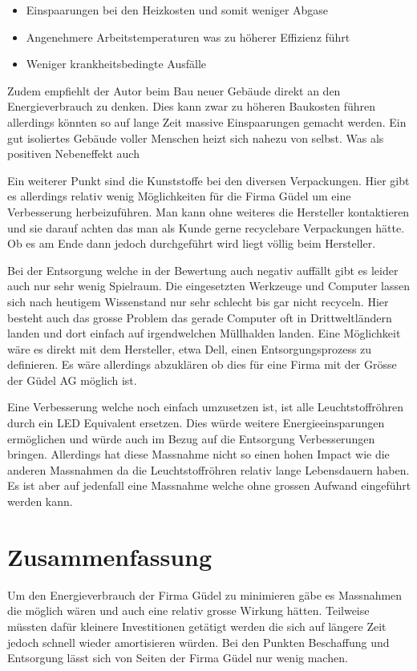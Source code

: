 \begin{itemize}
\item Einspaarungen bei den Heizkosten und somit weniger Abgase
\item Angenehmere Arbeitstemperaturen was zu höherer Effizienz führt
\item Weniger krankheitsbedingte Ausfälle
\end{itemize}

Zudem empfiehlt der Autor beim Bau neuer Gebäude direkt an den Energieverbrauch
zu denken. Dies kann zwar zu höheren Baukosten führen allerdings könnten so auf
lange Zeit massive Einspaarungen gemacht werden. Ein gut isoliertes Gebäude
voller Menschen heizt sich nahezu von selbst. Was als positiven Nebeneffekt auch 

Ein weiterer Punkt sind die Kunststoffe bei den diversen Verpackungen. Hier gibt
es allerdings relativ wenig Möglichkeiten für die Firma Güdel um eine
Verbesserung herbeizuführen. Man kann ohne weiteres die Hersteller kontaktieren
und sie darauf achten das man als Kunde gerne recyclebare Verpackungen hätte. Ob
es am Ende dann jedoch durchgeführt wird liegt völlig beim Hersteller.

Bei der Entsorgung welche in der Bewertung auch negativ auffällt gibt es leider
auch nur sehr wenig Spielraum. Die eingesetzten Werkzeuge und Computer lassen
sich nach heutigem Wissenstand nur sehr schlecht bis gar nicht recyceln. Hier
besteht auch das grosse Problem das gerade Computer oft in Drittweltländern
landen und dort einfach auf irgendwelchen Müllhalden landen. Eine Möglichkeit
wäre es direkt mit dem Hersteller, etwa Dell, einen Entsorgungsprozess zu
definieren. Es wäre allerdings abzuklären ob dies für eine Firma mit der
Grösse der Güdel AG möglich ist.

Eine Verbesserung welche noch einfach umzusetzen ist, ist alle Leuchtstoffröhren
durch ein LED Equivalent ersetzen. Dies würde weitere Energieeinsparungen
ermöglichen und würde auch im Bezug auf die Entsorgung Verbesserungen bringen.
Allerdings hat diese Massnahme nicht so einen hohen Impact wie die anderen
Massnahmen da die Leuchtstoffröhren relativ lange Lebensdauern haben. Es ist
aber auf jedenfall eine Massnahme welche ohne grossen Aufwand eingeführt werden
kann.
\section{Zusammenfassung}

Um den Energieverbrauch der Firma Güdel zu minimieren gäbe es Massnahmen
die möglich wären und auch eine relativ grosse Wirkung hätten. 
Teilweise müssten dafür kleinere Investitionen getätigt werden die sich auf 
längere Zeit jedoch schnell wieder amortisieren würden. Bei den Punkten 
Beschaffung und Entsorgung lässt sich von Seiten der Firma Güdel nur wenig 
machen.

